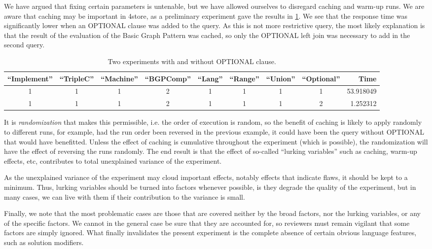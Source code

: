 \documentclass{llncs}
\begin{document}
We have argued that fixing certain parameters is untenable, but we
have allowed ourselves to disregard caching and warm-up runs. We are
aware that caching may be important in 4store, as a preliminary
experiment gave the results in \ref{tab:cacheexp}. We see that the
response time was significantly lower when an OPTIONAL clause was
added to the query. As this is not more restrictive query, the most
likely explanation is that the result of the evaluation of the Basic
Graph Pattern was cached, so only the OPTIONAL left join was necessary
to add in the second query.

\begin{table}[ht]
\begin{center}
\caption{Two experiments with and without OPTIONAL clause.}\label{tab:cacheexp}
\begin{tabular}{ccccccccr}
  \hline
``Implement'' & ``TripleC'' & ``Machine'' & ``BGPComp'' & ``Lang'' & ``Range'' & ``Union'' & ``Optional'' & Time \\
 \hline
1   &    1  &     1  &     2 &   1 &    1   &  1  & 1 &  53.918049 \\
1   &    1  &     1  &     2 &   1 &    1   &  1  & 2 &   1.252312 \\
   \hline
\end{tabular}
\end{center}
\end{table}

It is \emph{randomization} that makes this permissible, i.e. the order
of execution is random, so the benefit of caching is likely to apply
randomly to different runs, for example, had the run order been
reversed in the previous example, it could have been the query without
OPTIONAL that would have benefitted. Unless the effect of caching is
cumulative throughout the experiment (which is possible), the
randomization will have the effect of reversing the runs randomly. The
end result is that the effect of so-called ``lurking variables'' such
as caching, warm-up effects, etc, contributes to total unexplained
variance of the experiment.

As the unexplained variance of the experiment may cloud important
effects, notably effects that indicate flaws, it should be kept to a
minimum. Thus, lurking variables should be turned into factors
whenever possible, is they degrade the quality of the experiment, but
in many cases, we can live with them if their contribution to the
variance is small.

Finally, we note that the most problematic cases are those that are
covered neither by the broad factors, nor the lurking variables, or
any of the specific factors. We cannot in the general case be sure
that they are accounted for, so reviewers must remain vigilant that
some factors are simply ignored. What finally invalidates the present
experiment is the complete absence of certain obvious language
features, such as solution modifiers.
\end{document}

